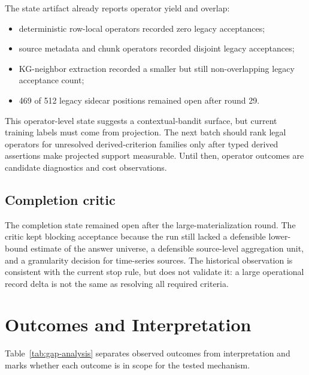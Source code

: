 \documentclass[11pt]{article}
\begin{document}
The state artifact already reports operator yield and overlap:

\begin{itemize}
  \item deterministic row-local operators recorded zero legacy acceptances;
  \item source metadata and chunk operators recorded disjoint legacy
  acceptances;
  \item KG-neighbor extraction recorded a smaller but still non-overlapping
  legacy acceptance count;
  \item 469 of 512 legacy sidecar positions remained open after round 29.
\end{itemize}

This operator-level state suggests a contextual-bandit surface, but current
training labels must come from projection.  The next batch should rank legal
operators for unresolved derived-criterion families only after typed derived
assertions make projected support measurable.  Until then, operator outcomes
are candidate diagnostics and cost observations.

\subsection{Completion critic}

The completion state remained open after the large-materialization round.  The
critic kept blocking acceptance because the run still lacked a defensible lower-bound
estimate of the answer universe, a defensible source-level aggregation unit, and
a granularity decision for time-series sources.  The historical observation is
consistent with the current stop rule, but does not validate it: a large
operational record delta is not the same as resolving all required criteria.

\section{Outcomes and Interpretation}

Table~\ref{tab:gap-analysis} separates observed outcomes from interpretation
and marks whether each outcome is in scope for the tested mechanism.
\end{document}
